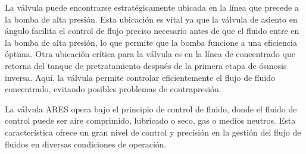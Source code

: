 La válvula puede encontrarse estratégicamente ubicada en la línea que precede a la bomba de alta presión. Esta ubicación es vital ya que la válvula de asiento en ángulo facilita el control de flujo preciso necesario antes de que el fluido entre en la bomba de alta presión, lo que permite que la bomba funcione a una eficiencia óptima. Otra ubicación crítica para la válvula es en la línea de concentrado que retorna del tanque de pretratamiento después de la primera etapa de ósmosis inversa. Aquí, la válvula permite controlar eficientemente el flujo de fluido concentrado, evitando posibles problemas de contrapresión.

La válvula ARES opera bajo el principio de control de fluido, donde el fluido de control puede ser aire comprimido, lubricado o seco, gas o medios neutros. Esta característica ofrece un gran nivel de control y precisión en la gestión del flujo de fluidos en diversas condiciones de operación.



